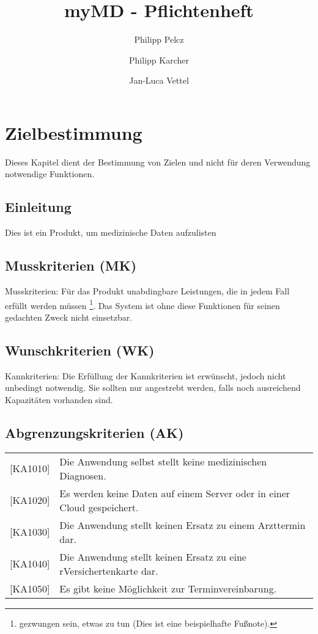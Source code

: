 \documentclass[a4paper]{scrreprt}
\begin{document}
 
\title{myMD - Pflichtenheft}

\author{Philipp Pelcz \and Philipp Karcher \and Jan-Luca Vettel}
\maketitle
 

\tableofcontents
 
\chapter{Zielbestimmung}
Dieses Kapitel dient der Bestimmung von Zielen und nicht für deren Verwendung
notwendige Funktionen.

\section{Einleitung}
Dies ist ein Produkt, um medizinische Daten aufzulisten
 
\section{Musskriterien (MK)}
Musskriterien: Für das Produkt unabdingbare Leistungen, die in jedem Fall
erfüllt werden müssen \footnote{gezwungen sein, etwas zu tun (Dies ist eine
beispielhafte Fußnote).}. Das System ist ohne diese Funktionen für seinen
gedachten Zweck nicht einsetzbar.
 
\section{Wunschkriterien (WK)}
Kannkriterien: Die Erfüllung der Kannkriterien ist erwünscht, jedoch nicht
unbedingt notwendig. Sie sollten nur angestrebt werden, falls noch ausreichend
Kapazitäten vorhanden sind.
 
\section{Abgrenzungskriterien (AK)}
\begin{tabular}{ll}
[KA1010] &  Die Anwendung selbst stellt keine medizinischen Diagnosen. \\
{[KA1020]} &  Es werden keine Daten auf einem Server oder in einer Cloud gespeichert. \\
{[KA1030]} &  Die Anwendung stellt keinen Ersatz zu einem Arzttermin dar. \\
{[KA1040]} &  Die Anwendung stellt keinen Ersatz zu eine rVersichertenkarte dar. \\
{[KA1050]} &  Es gibt keine Möglichkeit zur Terminvereinbarung. \\
\end{tabular}
\end{document}
